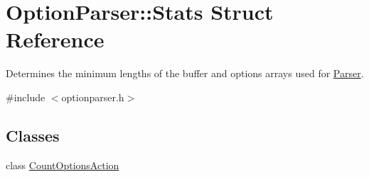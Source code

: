 \hypertarget{struct_option_parser_1_1_stats}{\section{Option\-Parser\-:\-:Stats Struct Reference}
\label{struct_option_parser_1_1_stats}
}


Determines the minimum lengths of the buffer and options arrays used for \hyperlink{class_option_parser_1_1_parser}{Parser}.  




{\ttfamily \#include $<$optionparser.\-h$>$}

\subsection*{Classes}
\begin{DoxyCompactItemize}
\item 
class \hyperlink{class_option_parser_1_1_stats_1_1_count_options_action}{Count\-Options\-Action}
\end{DoxyCompactItemize}
